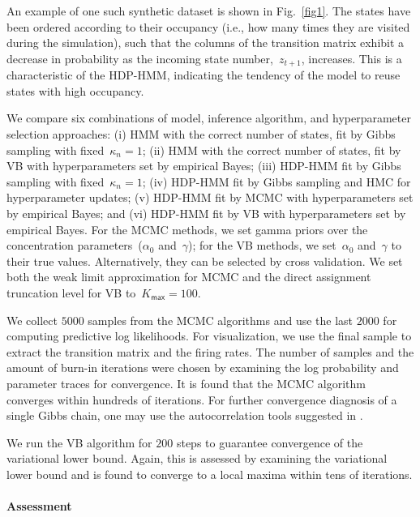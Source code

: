  An example of one such synthetic dataset is shown in
 Fig.~\ref{fig1}. The states have been ordered according to their
 occupancy (i.e., how many times they are visited during the
 simulation), such that the columns of the transition matrix exhibit a
 decrease in probability as the incoming state number,~$z_{t+1}$,
 increases. This is a characteristic of the HDP-HMM, indicating the
 tendency of the model to reuse states with high occupancy.

We compare six combinations of model, inference algorithm, and
hyperparameter selection approaches: (i) HMM with the correct number
of states, fit by Gibbs sampling with fixed~$\kappa_n=1$; (ii) HMM
with the correct number of states, fit by VB with hyperparameters set
by empirical Bayes; (iii) HDP-HMM fit by Gibbs sampling with
fixed~$\kappa_n=1$; (iv) HDP-HMM fit by Gibbs sampling and HMC for
hyperparameter updates; (v) HDP-HMM fit by MCMC with hyperparameters
set by empirical Bayes; and (vi) HDP-HMM fit by VB with
hyperparameters set by empirical Bayes. For the MCMC methods, we set
gamma priors over the concentration parameters~($\alpha_0$
and~$\gamma$); for the VB methods, we set~$\alpha_0$ and~$\gamma$ to
their true values. Alternatively, they can be selected by cross
validation. We set both the weak limit approximation for MCMC and the
direct assignment truncation level for VB to~${K_{\mathsf{max}}=100}$.

We collect $5000$ samples from the MCMC algorithms and use the last $2000$
for computing predictive log likelihoods. For visualization, we use
the final sample to extract the transition matrix and the firing
rates. The number of samples and the amount of burn-in iterations were
chosen by examining the log probability and parameter traces for
convergence. It is found that the MCMC algorithm converges within
hundreds of iterations. For further convergence diagnosis of a single
Gibbs chain, one may use the autocorrelation tools suggested in
\citep{RafteryLewis92,Cowles96}.

We run the VB algorithm for $200$ steps to guarantee convergence of the
variational lower bound. Again, this is assessed by examining the
variational lower bound and is found to converge to a local maxima
within tens of iterations.


\paragraph{Assessment} 

